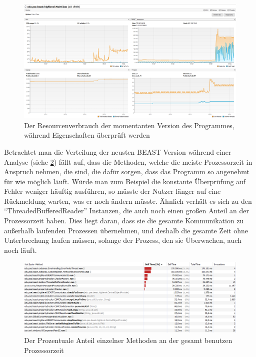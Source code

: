 \documentclass[a4paper]{scrreprt}
\begin{document}
\vspace{4cm}

\begin{figure}[ht]
	\centering
  \includegraphics[width=1.0\textwidth,
  height=0.40\textwidth]{images/NEW_YES.png} \caption{Der Resourcenverbrauch der
  momentanten Version des Programmes, während Eigenschaften überprüft werden}
	\label{fig4}
\end{figure}

\newpage
Betrachtet man die Verteilung der neusten BEAST Version während einer
Analyse (siehe \ref{fig5}) fällt auf, dass die Methoden, welche die meiste
Prozessorzeit in Anspruch nehmen, die sind, die dafür sorgen, dass das Programm
so angenehmt für wie möglich läuft. Würde man zum Beispiel die konstante
Überprüfung auf Fehler weniger häuftig ausführen, so müsste der Nutzer länger auf eine
Rückmeldung warten, was er noch ändern müsste. Ähnlich verhält es sich zu den
"`ThreadedBufferedReader"' Instanzen, die auch noch einen großen Anteil an der
Prozessorzeit haben. Dies liegt daran, dass sie die gesamte Kommunikation zu
außerhalb laufenden Prozessen übernehmen, und deshalb die gesamte Zeit ohne
Unterbrechung laufen müssen, solange der Prozess, den sie Überwachen, auch noch
läuft.

\begin{figure}[ht]
	\centering
  \includegraphics[width=1.0\textwidth,
  height=0.40\textwidth]{images/BEAST_PROCESSORTIME.png} \caption{Der
  Prozentuale Anteil einzelner Methoden an der gesamt benutzen Prozessorzeit}
	\label{fig5}
\end{figure}
\end{document}
